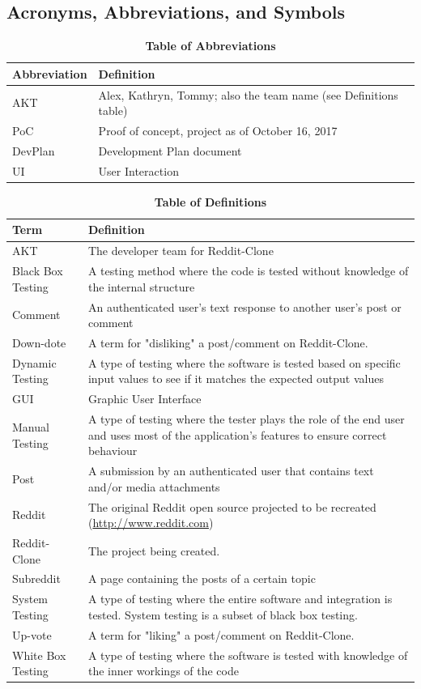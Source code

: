 \documentclass[12pt,fleqn]{article}
\begin{document}
\subsection {Acronyms, Abbreviations, and Symbols}

\begin{table}[ht]
\caption{\textbf{Table of Abbreviations}} \label{Abbreviations}
\begin{tabularx}{\textwidth}{p{3cm}X}
\toprule
\textbf{Abbreviation} & \textbf{Definition} \\
\midrule
AKT & Alex, Kathryn, Tommy; also the team name (see Definitions table)\\
PoC & Proof of concept, project as of October 16, 2017\\
DevPlan & Development Plan document \\
UI & User Interaction \\
\bottomrule
\end{tabularx}
\end{table}

\begin{table}[ht]
\caption{\textbf{Table of Definitions}} \label{Definitions}
\begin{tabularx}{\textwidth}{p{3cm}X}
\toprule
\textbf{Term} & \textbf{Definition}\\
\midrule
AKT & The developer team for Reddit-Clone\\
Black Box Testing & A testing method where the code is tested without knowledge of the internal structure \\
Comment & An authenticated user's text response to another user's post or comment \\
Down-dote & A term for "disliking" a post/comment on Reddit-Clone. \\
Dynamic Testing & A type of testing where the software is tested based on specific input values to see if it matches the expected output values \\
GUI & Graphic User Interface \\ 
Manual Testing & A type of testing where the tester plays the role of the end user and uses most of the application's features to ensure correct behaviour \\
Post & A submission by an authenticated user that contains text and/or media attachments \\
Reddit & The original Reddit open source projected to be recreated (\url{http://www.reddit.com})\\
Reddit-Clone & The project being created.\\
Subreddit & A page containing the posts of a certain topic \\
System Testing & A type of testing where the entire software and integration is tested. System testing is a subset of black box testing.\\
Up-vote & A term for "liking" a post/comment on Reddit-Clone.  \\
White Box Testing & A type of testing where the software is tested with knowledge of the inner workings of the code \\
\bottomrule
\end{tabularx}
\end{table}	
\end{document}
